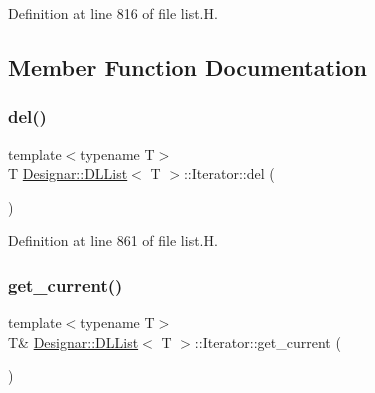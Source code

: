 Definition at line 816 of file list.\+H.



\subsection{Member Function Documentation}
\mbox{\label{class_designar_1_1_d_l_list_1_1_iterator_a98644b925b49ea22a9552039abb2624d}} 
\subsubsection{\texorpdfstring{del()}{del()}}
{\footnotesize\ttfamily template$<$typename T$>$ \\
T \hyperlink{class_designar_1_1_d_l_list}{Designar\+::\+D\+L\+List}$<$ T $>$\+::Iterator\+::del (\begin{DoxyParamCaption}{ }\end{DoxyParamCaption})\hspace{0.3cm}{\ttfamily [inline]}}



Definition at line 861 of file list.\+H.

\mbox{\label{class_designar_1_1_d_l_list_1_1_iterator_ad724b6e244dcd79d58b5772083e853ef}} 
\subsubsection{\texorpdfstring{get\+\_\+current()}{get\_current()}\hspace{0.1cm}{\footnotesize\ttfamily [1/2]}}
{\footnotesize\ttfamily template$<$typename T$>$ \\
T\& \hyperlink{class_designar_1_1_d_l_list}{Designar\+::\+D\+L\+List}$<$ T $>$\+::Iterator\+::get\+\_\+current (\begin{DoxyParamCaption}{ }\end{DoxyParamCaption})\hspace{0.3cm}{\ttfamily [inline]}}



